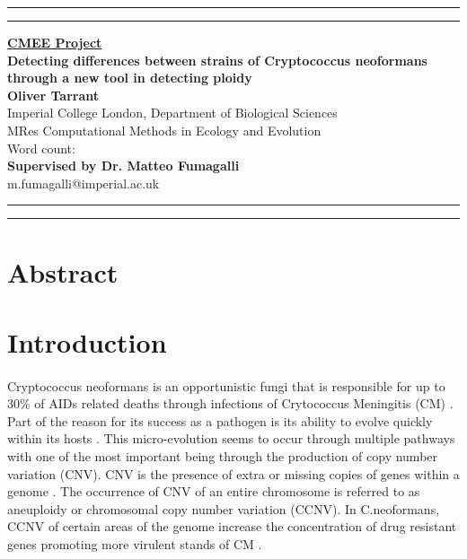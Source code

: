 \documentclass[11pt]{article}
\newcommand{\soptitle}{Detecting differences between strains of Cryptococcus neoformans through a new tool in detecting ploidy}
\begin{document}
\begin{titlepage}
\begin{center}
\hrule
\vspace{2pt}
\hrule
\vspace{2cm}
\LARGE {\bf \underline{CMEE Project}}\\
\vspace{2cm}
\huge{\bf \soptitle}\\
\vspace{4cm}
\LARGE {\bf Oliver Tarrant}\\
\large{Imperial College London, Department of Biological Sciences}\\
\large{MRes Computational Methods in Ecology and Evolution}\\
\vfill
\large{Word count: }\\
\huge {\bf Supervised by Dr. Matteo Fumagalli}\\
\large {m.fumagalli@imperial.ac.uk} 
\end{center}
\hrule
\vspace{2pt}
\hrule
\end{titlepage}
\linenumbers


\section{Abstract}

\section{Introduction}
\paragraph{}Cryptococcus neoformans is an opportunistic fungi that is responsible for up to 30\% of AIDs related deaths through infections of Crytococcus Meningitis (CM) \autocite{Vanhove2016}. Part of the reason for its success as a pathogen is its ability to evolve quickly within its hosts \autocite{Rhodes2017}. This micro-evolution seems to occur through multiple pathways with one of the most important being through the production of copy number variation (CNV). CNV is the presence of extra or missing copies of genes within a genome \autocite{Joao2015}. The occurrence of CNV of an entire chromosome is referred to as aneuploidy or chromosomal copy number variation (CCNV). In C.neoformans, CCNV of certain areas of the genome increase the concentration of drug resistant genes promoting more virulent stands of CM \autocite{Rhodes2017}.
\end{document}
